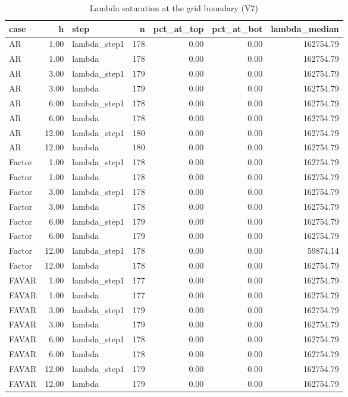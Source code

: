 \begin{table}[ht]
\centering
\begin{tabular}{lrlrrrr}
  \hline
case & h & step & n & pct\_at\_top & pct\_at\_bot & lambda\_median \\ 
  \hline
AR & 1.00 & lambda\_step1 & 178 & 0.00 & 0.00 & 162754.79 \\ 
  AR & 1.00 & lambda & 178 & 0.00 & 0.00 & 162754.79 \\ 
  AR & 3.00 & lambda\_step1 & 179 & 0.00 & 0.00 & 162754.79 \\ 
  AR & 3.00 & lambda & 179 & 0.00 & 0.00 & 162754.79 \\ 
  AR & 6.00 & lambda\_step1 & 178 & 0.00 & 0.00 & 162754.79 \\ 
  AR & 6.00 & lambda & 178 & 0.00 & 0.00 & 162754.79 \\ 
  AR & 12.00 & lambda\_step1 & 180 & 0.00 & 0.00 & 162754.79 \\ 
  AR & 12.00 & lambda & 180 & 0.00 & 0.00 & 162754.79 \\ 
  Factor & 1.00 & lambda\_step1 & 178 & 0.00 & 0.00 & 162754.79 \\ 
  Factor & 1.00 & lambda & 178 & 0.00 & 0.00 & 162754.79 \\ 
  Factor & 3.00 & lambda\_step1 & 178 & 0.00 & 0.00 & 162754.79 \\ 
  Factor & 3.00 & lambda & 178 & 0.00 & 0.00 & 162754.79 \\ 
  Factor & 6.00 & lambda\_step1 & 179 & 0.00 & 0.00 & 162754.79 \\ 
  Factor & 6.00 & lambda & 179 & 0.00 & 0.00 & 162754.79 \\ 
  Factor & 12.00 & lambda\_step1 & 178 & 0.00 & 0.00 & 59874.14 \\ 
  Factor & 12.00 & lambda & 178 & 0.00 & 0.00 & 162754.79 \\ 
  FAVAR & 1.00 & lambda\_step1 & 177 & 0.00 & 0.00 & 162754.79 \\ 
  FAVAR & 1.00 & lambda & 177 & 0.00 & 0.00 & 162754.79 \\ 
  FAVAR & 3.00 & lambda\_step1 & 179 & 0.00 & 0.00 & 162754.79 \\ 
  FAVAR & 3.00 & lambda & 179 & 0.00 & 0.00 & 162754.79 \\ 
  FAVAR & 6.00 & lambda\_step1 & 178 & 0.00 & 0.00 & 162754.79 \\ 
  FAVAR & 6.00 & lambda & 178 & 0.00 & 0.00 & 162754.79 \\ 
  FAVAR & 12.00 & lambda\_step1 & 179 & 0.00 & 0.00 & 162754.79 \\ 
  FAVAR & 12.00 & lambda & 179 & 0.00 & 0.00 & 162754.79 \\ 
   \hline
\end{tabular}
\caption{Lambda saturation at the grid boundary (V7)} 
\label{tab:lambda_saturation}
\end{table}
